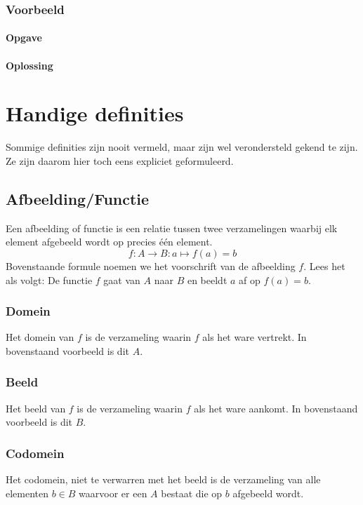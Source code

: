 \documentclass[lineaire_algebra_oplossingen.tex]{subfiles}
\begin{document}
\subsection*{Voorbeeld}

\subsubsection*{Opgave}

\subsubsection*{Oplossing}



\chapter{Handige definities}
Sommige definities zijn nooit vermeld, maar zijn wel verondersteld gekend te zijn. Ze zijn daarom hier toch eens expliciet geformuleerd.

\section{Afbeelding/Functie}
\label{afbeelding}
Een afbeelding of functie is een relatie tussen twee verzamelingen waarbij elk element afgebeeld wordt op precies \'e\'en element.
\[
f : A \rightarrow B : a \mapsto f(a)=b
\]
Bovenstaande formule noemen we het voorschrift van de afbeelding $f$.
Lees het als volgt:
De functie $f$ gaat van $A$ naar $B$ en beeldt $a$ af op $f(a)=b$.


\subsection{Domein}
\label{domain}
Het domein van $f$ is de verzameling waarin $f$ als het ware vertrekt. In bovenstaand voorbeeld is dit $A$.

\subsection{Beeld}
\label{beeld}
Het beeld van $f$ is de verzameling waarin $f$ als het ware aankomt. In bovenstaand voorbeeld is dit $B$.

\subsection{Codomein}
\label{codomein}
Het codomein, niet te verwarren met het beeld is de verzameling van alle elementen $b\in B$ waarvoor er een $A$ bestaat die op $b$ afgebeeld wordt.
\end{document}

